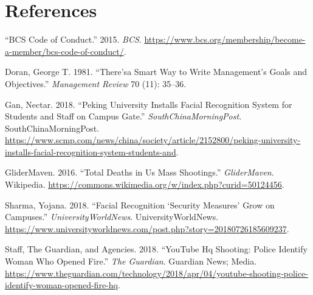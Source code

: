 \documentclass[
  english,
  a4paper,
,tablecaptionabove
]{scrartcl}
\begin{document}
\hypertarget{references}{%
\section*{References}\label{references}}

\hypertarget{refs}{}
\leavevmode\hypertarget{ref-bcs}{}%
``BCS Code of Conduct.'' 2015. \emph{BCS}.
\url{https://www.bcs.org/membership/become-a-member/bcs-code-of-conduct/}.

\leavevmode\hypertarget{ref-doran1981there}{}%
Doran, George T. 1981. ``There'sa Smart Way to Write Management's Goals
and Objectives.'' \emph{Management Review} 70 (11): 35--36.

\leavevmode\hypertarget{ref-china-facerec}{}%
Gan, Nectar. 2018. ``Peking University Installs Facial Recognition
System for Students and Staff on Campus Gate.''
\emph{SouthChinaMorningPost}. SouthChinaMorningPost.
\url{https://www.scmp.com/news/china/society/article/2152800/peking-university-installs-facial-recognition-system-students-and}.

\leavevmode\hypertarget{ref-glidermaven}{}%
GliderMaven. 2016. ``Total Deaths in Us Mass Shootings.''
\emph{GliderMaven}. Wikipedia.
\url{https://commons.wikimedia.org/w/index.php?curid=50124456}.

\leavevmode\hypertarget{ref-china-facialrec}{}%
Sharma, Yojana. 2018. ``Facial Recognition `Security Measures' Grow on
Campuses.'' \emph{UniversityWorldNews}. UniversityWorldNews.
\url{https://www.universityworldnews.com/post.php?story=20180726185609237}.

\leavevmode\hypertarget{ref-agencies_2018}{}%
Staff, The Guardian, and Agencies. 2018. ``YouTube Hq Shooting: Police
Identify Woman Who Opened Fire.'' \emph{The Guardian}. Guardian News;
Media.
\url{https://www.theguardian.com/technology/2018/apr/04/youtube-shooting-police-identify-woman-opened-fire-hq}.
\end{document}
